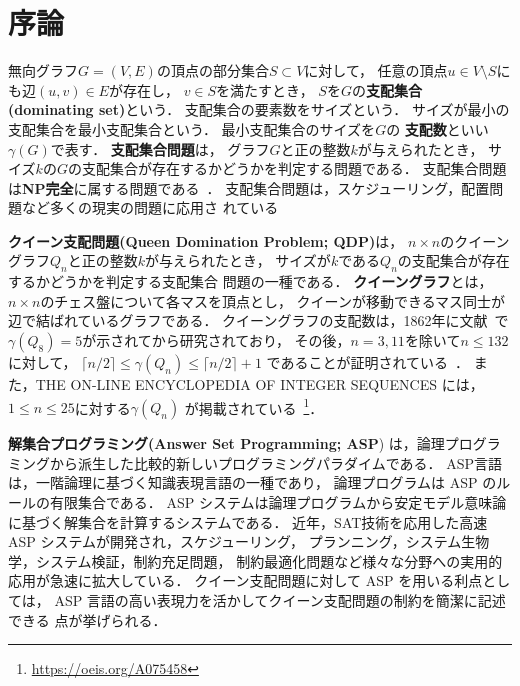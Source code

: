 \chapter{序論}\label{chap:introduction}

無向グラフ$G=(V,E)$の頂点の部分集合$S\subset V$に対して，
任意の頂点$u \in V\setminus S$にも辺$(u,v) \in E$が存在し，
$v \in S$を満たすとき，
$S$を$G$の\textbf{支配集合 (dominating set)}という．
支配集合の要素数をサイズという．
サイズが最小の支配集合を最小支配集合という．
最小支配集合のサイズを$G$の
\textbf{支配数}といい$\gamma(G)$で表す．
% 
\textbf{支配集合問題}は，
グラフ$G$と正の整数$k$が与えられたとき，
サイズ$k$の$G$の支配集合が存在するかどうかを判定する問題である．
支配集合問題は\textbf{NP完全}に属する問題である~\cite{Jhonson79}．
支配集合問題は，スケジューリング，配置問題など多くの現実の問題に応用さ
れている~\cite{Haynes98,Haynes98Advanced}

\textbf{クイーン支配問題(Queen Domination Problem; QDP)}は，
$n \times n$のクイーングラフ$Q_{n}$と正の整数$k$が与えられたとき，
サイズが$k$である$Q_{n}$の支配集合が存在するかどうかを判定する支配集合
問題の一種である．
\textbf{クイーングラフ}とは，
$n\times n$のチェス盤について各マスを頂点とし，
クイーンが移動できるマス同士が辺で結ばれているグラフである．
クイーングラフの支配数は，1862年に文献~\cite{Jaenisch62}で
$\gamma(Q_8)=5$が示されてから研究されており，
その後，$n=3,11$を除いて$n \leq 132$に対して，
$\lceil n/2 \rceil \leq \gamma(Q_n) \leq \lceil n/2 \rceil +1$
であることが証明されている~\cite{Ostergard01}．
また，THE ON-LINE ENCYCLOPEDIA OF INTEGER SEQUENCES には，
$1\leq n\leq 25$に対する$\gamma(Q_n)$
が掲載されている~\footnote{\url{https://oeis.org/A075458}}．

\textbf{解集合プログラミング(Answer Set Programming; ASP}\cite{%
  Baral03:cambridge,%
  Gelfond88:iclp,%
  Inoue08:jssst,%
  Niemela99:amai})
は，論理プログラミングから派生した比較的新しいプログラミングパラダイムである．
ASP言語は，一階論理に基づく知識表現言語の一種であり，
論理プログラムは ASP のルールの有限集合である．
ASP システムは論理プログラムから安定モデル意味論に基づく解集合を計算するシステムである．
近年，SAT技術を応用した高速 ASP システムが開発され，スケジューリング，
プランニング，システム生物学，システム検証，制約充足問題，
制約最適化問題など様々な分野への実用的応用が急速に拡大している．
クイーン支配問題に対して ASP を用いる利点としては，
ASP 言語の高い表現力を活かしてクイーン支配問題の制約を簡潔に記述できる
点が挙げられる．

